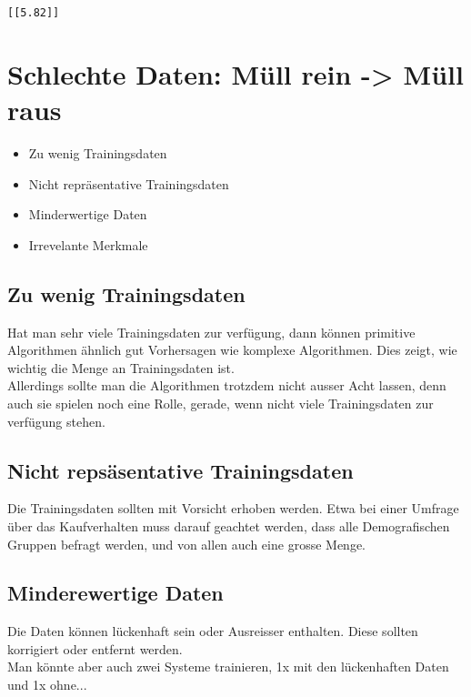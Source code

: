 \documentclass[11pt]{article}
\providecommand{\tightlist}{%
      \setlength{\itemsep}{0pt}\setlength{\parskip}{0pt}}
\begin{document}
    \begin{Verbatim}[commandchars=\\\{\}]
[[5.82]]

    \end{Verbatim}

    \section{Schlechte Daten: Müll rein -\textgreater{} Müll
raus}\label{schlechte-daten-muxfcll-rein---muxfcll-raus}

\begin{itemize}
\tightlist
\item
  Zu wenig Trainingsdaten
\item
  Nicht repräsentative Trainingsdaten
\item
  Minderwertige Daten
\item
  Irrevelante Merkmale
\end{itemize}

\subsection{Zu wenig Trainingsdaten}\label{zu-wenig-trainingsdaten}

Hat man sehr viele Trainingsdaten zur verfügung, dann können primitive
Algorithmen ähnlich gut Vorhersagen wie komplexe Algorithmen. Dies
zeigt, wie wichtig die Menge an Trainingsdaten ist.\\
Allerdings sollte man die Algorithmen trotzdem nicht ausser Acht lassen,
denn auch sie spielen noch eine Rolle, gerade, wenn nicht viele
Trainingsdaten zur verfügung stehen.

\subsection{Nicht repsäsentative
Trainingsdaten}\label{nicht-repsuxe4sentative-trainingsdaten}

Die Trainingsdaten sollten mit Vorsicht erhoben werden. Etwa bei einer
Umfrage über das Kaufverhalten muss darauf geachtet werden, dass alle
Demografischen Gruppen befragt werden, und von allen auch eine grosse
Menge.

\subsection{Minderewertige Daten}\label{minderewertige-daten}

Die Daten können lückenhaft sein oder Ausreisser enthalten. Diese
sollten korrigiert oder entfernt werden.\\
Man könnte aber auch zwei Systeme trainieren, 1x mit den lückenhaften
Daten und 1x ohne...
\end{document}
